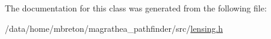 The documentation for this class was generated from the following file\-:\begin{DoxyCompactItemize}
\item 
/data/home/mbreton/magrathea\-\_\-pathfinder/src/\hyperlink{lensing_8h}{lensing.\-h}\end{DoxyCompactItemize}
